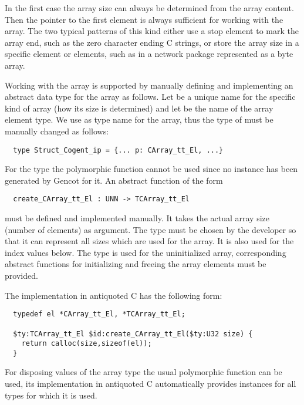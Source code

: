 In the first case the array size can always be determined from the array content. Then the pointer to the first 
element is always sufficient for working with the array. The two typical patterns of this kind either use a 
stop element to mark the array end, such as the zero character ending C strings, or store the array size in a
specific element or elements, such as in a network package represented as a byte array.

Working with the array is supported by manually defining and implementing an abstract data type for the array as follows.
Let  be a unique name for the specific kind of array (how its size is determined) and let  be the
name of the array element type. We use  as type name for the array, thus the 
type of  must be manually changed as follows:
\begin{verbatim}
  type Struct_Cogent_ip = {... p: CArray_tt_El, ...}
\end{verbatim}

For the type  the polymorphic function  cannot be used since no instance has been
generated by Gencot for it. An abstract function of the form
\begin{verbatim}
  create_CArray_tt_El : UNN -> TCArray_tt_El
\end{verbatim}
must be defined and implemented manually. It takes the actual array size (number of elements) as argument. The type  must be
chosen by the developer so that it can represent all sizes which are used for the array. It is also used for the index
values below. The type 
 is used for the uninitialized array, corresponding abstract functions for initializing
and freeing the array elements must be provided.

The implementation in antiquoted C has the following form:
\begin{verbatim}
  typedef el *CArray_tt_El, *TCArray_tt_El;
  
  $ty:TCArray_tt_El $id:create_CArray_tt_El($ty:U32 size) { 
    return calloc(size,sizeof(el));
  }
\end{verbatim}

For disposing values of the array type the usual polymorphic function  can be used, its implementation in
antiquoted C automatically provides instances for all types for which it is used.




